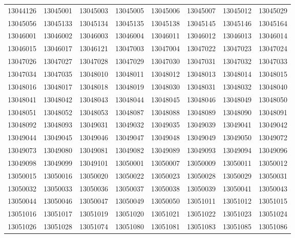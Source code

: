 \documentclass[abstract = on,listof=totoc, bibliography=totoc]{scrreprt}
\begin{document}
\tiny{
\begin{longtable}{cccccccc} \hline
13044126  &  13045001  &  13045003  &  13045005  &  13045006  &  13045007  &  13045012  &  13045029  \\ 
13045056  &  13045133  &  13045134  &  13045135  &  13045138  &  13045145  &  13045146  &  13045164  \\ 
13046001  &  13046002  &  13046003  &  13046004  &  13046011  &  13046012  &  13046013  &  13046014  \\ 
13046015  &  13046017  &  13046121  &  13047003  &  13047004  &  13047022  &  13047023  &  13047024  \\ 
13047026  &  13047027  &  13047028  &  13047029  &  13047030  &  13047031  &  13047032  &  13047033  \\ 
13047034  &  13047035  &  13048010  &  13048011  &  13048012  &  13048013  &  13048014  &  13048015  \\ 
13048016  &  13048017  &  13048018  &  13048019  &  13048030  &  13048031  &  13048032  &  13048040  \\ 
13048041  &  13048042  &  13048043  &  13048044  &  13048045  &  13048046  &  13048049  &  13048050  \\ 
13048051  &  13048052  &  13048053  &  13048087  &  13048088  &  13048089  &  13048090  &  13048091  \\ 
13048092  &  13048093  &  13049031  &  13049032  &  13049035  &  13049039  &  13049041  &  13049042  \\ 
13049044  &  13049045  &  13049046  &  13049047  &  13049048  &  13049049  &  13049050  &  13049072  \\ 
13049073  &  13049080  &  13049081  &  13049082  &  13049089  &  13049093  &  13049094  &  13049096  \\ 
13049098  &  13049099  &  13049101  &  13050001  &  13050007  &  13050009  &  13050011  &  13050012  \\ 
13050015  &  13050016  &  13050020  &  13050022  &  13050023  &  13050028  &  13050029  &  13050031  \\ 
13050032  &  13050033  &  13050036  &  13050037  &  13050038  &  13050039  &  13050041  &  13050043  \\ 
13050044  &  13050046  &  13050047  &  13050049  &  13050050  &  13051011  &  13051012  &  13051015  \\ 
13051016  &  13051017  &  13051019  &  13051020  &  13051021  &  13051022  &  13051023  &  13051024  \\ 
13051026  &  13051028  &  13051074  &  13051080  &  13051081  &  13051083  &  13051085  &  13051086  \\ 

\end{longtable}}
\end{document}
